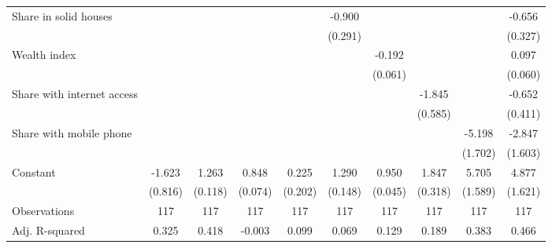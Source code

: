 {{\begin{tabular}{l*{9}{c}}
Share in solid houses&                  &                  &                  &                  &   -0.900\sym{***}&                  &                  &                  &   -0.656\sym{**} \\
                &                  &                  &                  &                  &  (0.291)         &                  &                  &                  &  (0.327)         \\
Wealth index    &                  &                  &                  &                  &                  &   -0.192\sym{***}&                  &                  &    0.097         \\
                &                  &                  &                  &                  &                  &  (0.061)         &                  &                  &  (0.060)         \\
Share with internet access&                  &                  &                  &                  &                  &                  &   -1.845\sym{***}&                  &   -0.652         \\
                &                  &                  &                  &                  &                  &                  &  (0.585)         &                  &  (0.411)         \\
Share with mobile phone&                  &                  &                  &                  &                  &                  &                  &   -5.198\sym{***}&   -2.847\sym{*}  \\
                &                  &                  &                  &                  &                  &                  &                  &  (1.702)         &  (1.603)         \\
Constant        &   -1.623\sym{**} &    1.263\sym{***}&    0.848\sym{***}&    0.225         &    1.290\sym{***}&    0.950\sym{***}&    1.847\sym{***}&    5.705\sym{***}&    4.877\sym{***}\\
                &  (0.816)         &  (0.118)         &  (0.074)         &  (0.202)         &  (0.148)         &  (0.045)         &  (0.318)         &  (1.589)         &  (1.621)         \\
\hline
Observations    &\num{117}         &\num{117}         &\num{117}         &\num{117}         &\num{117}         &\num{117}         &\num{117}         &\num{117}         &\num{117}         \\
Adj. R-squared  &    0.325         &    0.418         &   -0.003         &    0.099         &    0.069         &    0.129         &    0.189         &    0.383         &    0.466         \\

\end{tabular}}}
